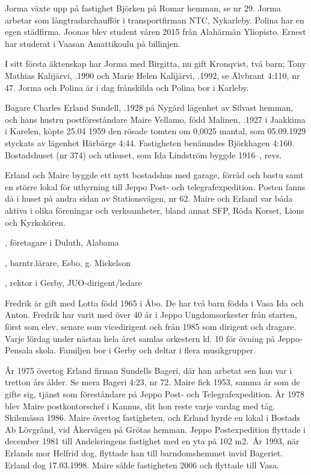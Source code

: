 Jorma växte upp på fastighet Björken på Romar hemman, se nr 29. Jorma arbetar som långtradarchaufför i transportfirman NTC, Nykarleby. Polina har en egen städfirma. Joonas blev student våren 2015 från Alahärmän Yliopisto. Ernest har studerat i Vaasan Amattikoulu på billinjen.

I sitt första äktenskap har Jorma med Birgitta, nu gift Kronqvist, två barn; Tony Mathias Kalijärvi,	.1990 och Marie Helen Kalijärvi, .1992, se Älvbrant 4:110, nr 47. Jorma och Polina är i dag frånskilda och Polina bor i Karleby.


Bagare Charles Erland Sundell, .1928 på Nygård lägenhet av Silvast hemman, och hans hustru 		postföreståndare Maire Vellamo, född Malinen, .1927 i Jaakkima i Karelen, köpte 25.04 1959 den rösade tomten om 0,0025 mantal, som 05.09.1929 styckats av lägenhet Härbärge 4:44. Fastigheten benämndes Björkhagen 4:160. Bostadshuset (nr 374) och uthuset, som Ida Lindström byggde 1916--, revs.

Erland och Maire byggde ett nytt bostadshus med garage, förråd och bastu samt en större lokal för uthyrning till Jeppo 	Post- och telegrafexpedition. Posten fanns då i huset på andra sidan av Stationsvägen, nr 62.	Maire och Erland var båda aktiva i olika föreningar och	verksamheter, bland annat SFP, Röda Korset, Lions och	Kyrkokören.
\begin{jhchildren}
  \item {}, företagare i Duluth, Alabama
  \item {}, barntr.lärare, Esbo, g. Mickelson
  \item {}, rektor i Gerby, JUO-dirigent/ledare
\end{jhchildren}
Fredrik är gift med Lotta född 1965 i Åbo. De har två barn födda i Vasa Ida och Anton. Fredrik har varit med över 40 år i Jeppo Ungdomsorkester från starten, först som elev, senare som vicedirigent och från 1985 som dirigent och dragare. Varje lördag under nästan hela året samlas orkestern kl. 10 för övning på Jeppo-Pensala	skola. Familjen bor i Gerby och deltar i flera musikgrupper.

År 1975 övertog Erland firman Sundells Bageri, där han arbetat sen han var i tretton års ålder. Se mera Bageri 4:23, nr 72. Maire fick 1953, samma år som de gifte sig, tjänst som föreståndare på Jeppo Post- och Telegrafexpedition. År 1978 blev Maire postkontorschef i Kannus, dit hon reste varje vardag med tåg. Skilsmässa 1986. Maire övertog fastigheten, och Erland hyrde en lokal i Bostads Ab Lövgränd, vid Åkervägen på Grötas hemman. Jeppo Postexpedition flyttade i december 1981 till Andelsringens fastighet med en yta på 102 m2. År 1993, när Erlands mor Helfrid dog, flyttade han till barndomshemmet invid Bageriet. Erland dog 17.03.1998. Maire sålde fastigheten 2006 och flyttade till Vasa.


